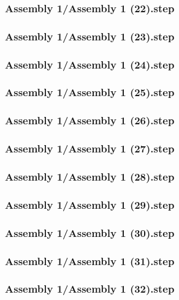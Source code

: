 \documentclass[a4paper,12pt]{article}
\begin{document}
\subsubsection{Assembly 1/Assembly 1 (22).step}

\subsubsection{Assembly 1/Assembly 1 (23).step}

\subsubsection{Assembly 1/Assembly 1 (24).step}

\subsubsection{Assembly 1/Assembly 1 (25).step}

\subsubsection{Assembly 1/Assembly 1 (26).step}

\subsubsection{Assembly 1/Assembly 1 (27).step}

\subsubsection{Assembly 1/Assembly 1 (28).step}

\subsubsection{Assembly 1/Assembly 1 (29).step}

\subsubsection{Assembly 1/Assembly 1 (30).step}

\subsubsection{Assembly 1/Assembly 1 (31).step}

\subsubsection{Assembly 1/Assembly 1 (32).step}

\end{document}
